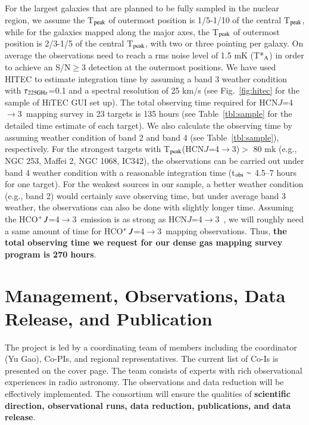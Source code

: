 \documentclass[legal,11pt]{article}
\def\,{\thinspace}
\def\HCNft        {HCN\,$J$=4$\rightarrow$3}
\def\HCOPft     {HCO$^+\,J$=4$\rightarrow$3}
\begin{document}
For the largest galaxies that are planned to be fully sampled in the nuclear
region, we assume the T$_{\rm peak}$ of outermost position is 1/5-1/10 of the
central T$_{\rm peak}$, while for the galaxies mapped along the major axes, the
T$_{\rm peak}$ of outermost position is 2/3-1/5 of the central T$_{\rm peak}$,
with two or three pointing per galaxy.  On average the observations need to
reach a rms noise level of 1.5 mK (T*$_{\rm A}$) in order to achieve an
S/N$\geq$3 detection at the outermost positions. We have used HITEC to estimate
integration time by assuming a band 3 weather condition with $\tau_{\rm
225GHz}$=0.1 and a spectral resolution of 25 km/s (see Fig.~\ref{fig:hitec} for
the sample of HiTEC GUI set up). The total observing time required for \HCNft\
mapping survey in 23 targets is 135 hours (see Table~\ref{tbl:sample} for the
detailed time estimate of each target).  We also calculate the observing time
by assuming weather condition of band 2 and band 4 (see
Table~\ref{tbl:sample}), respectively. For the strongest targets with T$_{\rm
peak}$(\HCNft)$>$ 80 mk (e.g., NGC 253, Maffei 2, NGC 1068, IC342),  the
observations can be carried out under band 4 weather condition with a
reasonable integration time (t$_{\rm obs}\sim$ 4.5--7 hours for one target).
For the weakest sources in our sample, a better weather condition (e.g., band
2) would certainly save observing time, but under average band 3 weather, the
observations can also be done with slightly longer time.  Assuming the \HCOPft\
emission is as strong as \HCNft\ \citep[see][]{zgh2014}, we will roughly need a
same amount of time for \HCOPft\ mapping observations.  Thus, {\bf the total
observing time we request for our dense gas mapping survey program is
270 hours}.



\section{Management, Observations, Data Release, and Publication } 


The project is led by a coordinating team of members including the coordinator
(Yu Gao), Co-PIs, and regional representatives. The current list of Co-Is is
presented on the cover page. The team consists of experts with rich
observational experiences in radio astronomy.  The observations and data
reduction will be effectively implemented.  The consortium will ensure the
qualities of {\bf scientific direction, observational runs, data reduction,
publications, and data release}. 
\end{document}
